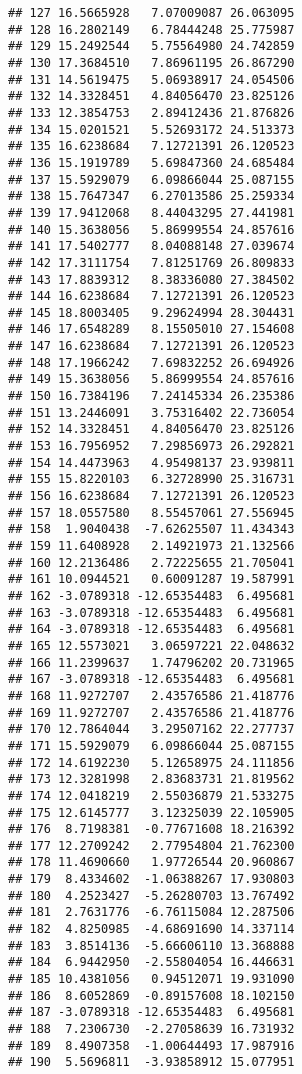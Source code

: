\documentclass[]{article}
\begin{document}
\begin{verbatim}
## 127 16.5665928   7.07009087 26.063095
## 128 16.2802149   6.78444248 25.775987
## 129 15.2492544   5.75564980 24.742859
## 130 17.3684510   7.86961195 26.867290
## 131 14.5619475   5.06938917 24.054506
## 132 14.3328451   4.84056470 23.825126
## 133 12.3854753   2.89412436 21.876826
## 134 15.0201521   5.52693172 24.513373
## 135 16.6238684   7.12721391 26.120523
## 136 15.1919789   5.69847360 24.685484
## 137 15.5929079   6.09866044 25.087155
## 138 15.7647347   6.27013586 25.259334
## 139 17.9412068   8.44043295 27.441981
## 140 15.3638056   5.86999554 24.857616
## 141 17.5402777   8.04088148 27.039674
## 142 17.3111754   7.81251769 26.809833
## 143 17.8839312   8.38336080 27.384502
## 144 16.6238684   7.12721391 26.120523
## 145 18.8003405   9.29624994 28.304431
## 146 17.6548289   8.15505010 27.154608
## 147 16.6238684   7.12721391 26.120523
## 148 17.1966242   7.69832252 26.694926
## 149 15.3638056   5.86999554 24.857616
## 150 16.7384196   7.24145334 26.235386
## 151 13.2446091   3.75316402 22.736054
## 152 14.3328451   4.84056470 23.825126
## 153 16.7956952   7.29856973 26.292821
## 154 14.4473963   4.95498137 23.939811
## 155 15.8220103   6.32728990 25.316731
## 156 16.6238684   7.12721391 26.120523
## 157 18.0557580   8.55457061 27.556945
## 158  1.9040438  -7.62625507 11.434343
## 159 11.6408928   2.14921973 21.132566
## 160 12.2136486   2.72225655 21.705041
## 161 10.0944521   0.60091287 19.587991
## 162 -3.0789318 -12.65354483  6.495681
## 163 -3.0789318 -12.65354483  6.495681
## 164 -3.0789318 -12.65354483  6.495681
## 165 12.5573021   3.06597221 22.048632
## 166 11.2399637   1.74796202 20.731965
## 167 -3.0789318 -12.65354483  6.495681
## 168 11.9272707   2.43576586 21.418776
## 169 11.9272707   2.43576586 21.418776
## 170 12.7864044   3.29507162 22.277737
## 171 15.5929079   6.09866044 25.087155
## 172 14.6192230   5.12658975 24.111856
## 173 12.3281998   2.83683731 21.819562
## 174 12.0418219   2.55036879 21.533275
## 175 12.6145777   3.12325039 22.105905
## 176  8.7198381  -0.77671608 18.216392
## 177 12.2709242   2.77954804 21.762300
## 178 11.4690660   1.97726544 20.960867
## 179  8.4334602  -1.06388267 17.930803
## 180  4.2523427  -5.26280703 13.767492
## 181  2.7631776  -6.76115084 12.287506
## 182  4.8250985  -4.68691690 14.337114
## 183  3.8514136  -5.66606110 13.368888
## 184  6.9442950  -2.55804054 16.446631
## 185 10.4381056   0.94512071 19.931090
## 186  8.6052869  -0.89157608 18.102150
## 187 -3.0789318 -12.65354483  6.495681
## 188  7.2306730  -2.27058639 16.731932
## 189  8.4907358  -1.00644493 17.987916
## 190  5.5696811  -3.93858912 15.077951

\end{verbatim}
\end{document}
